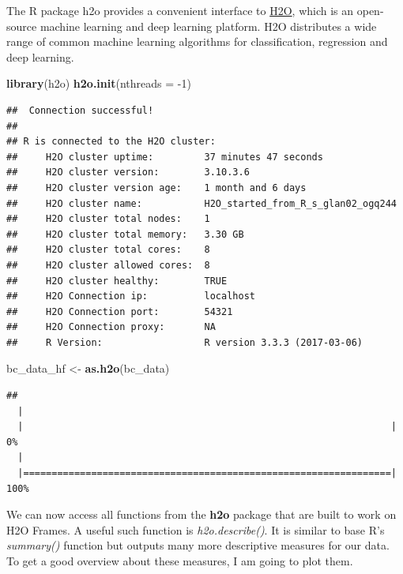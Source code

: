 \documentclass[]{article}
\newenvironment{Shaded}{\begin{snugshade}}{\end{snugshade}}
\newcommand{\KeywordTok}[1]{\textcolor[rgb]{0.13,0.29,0.53}{\textbf{{#1}}}}
\newcommand{\DataTypeTok}[1]{\textcolor[rgb]{0.13,0.29,0.53}{{#1}}}
\newcommand{\DecValTok}[1]{\textcolor[rgb]{0.00,0.00,0.81}{{#1}}}
\newcommand{\StringTok}[1]{\textcolor[rgb]{0.31,0.60,0.02}{{#1}}}
\newcommand{\NormalTok}[1]{{#1}}
\begin{document}
The R package h2o provides a convenient interface to
\href{http://www.h2o.ai/h2o/}{H2O}, which is an open-source machine
learning and deep learning platform. H2O distributes a wide range of
common machine learning algorithms for classification, regression and
deep learning.

\begin{Shaded}
\begin{Highlighting}[]
\KeywordTok{library}\NormalTok{(h2o)}
\KeywordTok{h2o.init}\NormalTok{(}\DataTypeTok{nthreads =} \NormalTok{-}\DecValTok{1}\NormalTok{)}
\end{Highlighting}
\end{Shaded}

\begin{verbatim}
##  Connection successful!
## 
## R is connected to the H2O cluster: 
##     H2O cluster uptime:         37 minutes 47 seconds 
##     H2O cluster version:        3.10.3.6 
##     H2O cluster version age:    1 month and 6 days  
##     H2O cluster name:           H2O_started_from_R_s_glan02_ogq244 
##     H2O cluster total nodes:    1 
##     H2O cluster total memory:   3.30 GB 
##     H2O cluster total cores:    8 
##     H2O cluster allowed cores:  8 
##     H2O cluster healthy:        TRUE 
##     H2O Connection ip:          localhost 
##     H2O Connection port:        54321 
##     H2O Connection proxy:       NA 
##     R Version:                  R version 3.3.3 (2017-03-06)
\end{verbatim}

\begin{Shaded}
\begin{Highlighting}[]
\NormalTok{bc_data_hf <-}\StringTok{ }\KeywordTok{as.h2o}\NormalTok{(bc_data)}
\end{Highlighting}
\end{Shaded}

\begin{verbatim}
## 
  |                                                                       
  |                                                                 |   0%
  |                                                                       
  |=================================================================| 100%
\end{verbatim}

We can now access all functions from the \textbf{h2o} package that are
built to work on H2O Frames. A useful such function is
\emph{h2o.describe()}. It is similar to base R's \emph{summary()}
function but outputs many more descriptive measures for our data. To get
a good overview about these measures, I am going to plot them.
\end{document}

